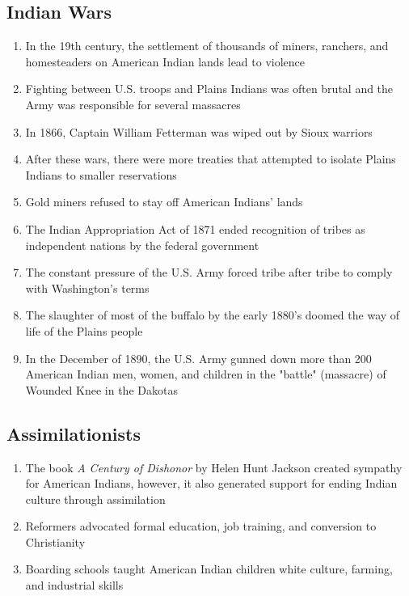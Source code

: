 \documentclass[12pt]{article} %
\begin{document}
\subsection{Indian Wars}
\begin{enumerate}
	\item In the 19th century, the settlement of thousands of miners, ranchers, and homesteaders on
		American Indian lands lead to violence
	\item Fighting between U.S. troops and Plains Indians was often brutal and the Army was 
		responsible for several massacres
	\item In 1866, Captain William Fetterman was wiped out by Sioux warriors
	\item After these wars, there were more treaties that attempted to isolate Plains Indians to 
		smaller reservations
	\item Gold miners refused to stay off American Indians' lands 
	\item The Indian Appropriation Act of 1871 ended recognition of tribes as independent nations
		by the federal government
	\item The constant pressure of the U.S. Army forced tribe after tribe to comply with 
		Washington's terms
	\item The slaughter of most of the buffalo by the early 1880's doomed the way of life of the 
		Plains people
	\item In the December of 1890, the U.S. Army gunned down more than 200 American Indian men, women,
		and children in the "battle" (massacre) of Wounded Knee in the Dakotas
\end{enumerate}

\subsection{Assimilationists}
\begin{enumerate}
	\item The book \textit{A Century of Dishonor} by Helen Hunt Jackson created sympathy for American
		Indians, however, it also generated support for ending Indian culture through assimilation
	\item Reformers advocated formal education, job training, and conversion to Christianity
	\item Boarding schools taught American Indian children white culture, farming, and industrial skills
\end{enumerate}
\end{document}
